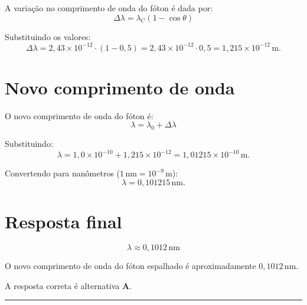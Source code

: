 \documentclass[a4paper,12pt]{article}
\begin{document}
\begin{flushleft}
A variação no comprimento de onda do fóton é dada por:
\[
\Delta \lambda = \lambda_C (1 - \cos\theta)
\]

Substituindo os valores:
\[
\Delta \lambda =
2{,}43 \times 10^{-12} \cdot (1 - 0{,}5) =
2{,}43 \times 10^{-12} \cdot 0{,}5 =
1{,}215 \times 10^{-12}\,\mathrm{m}.
\]

\section*{Novo comprimento de onda}

O novo comprimento de onda do fóton é:
\[
\lambda = \lambda_0 + \Delta\lambda
\]

Substituindo:
\[
\lambda =
1{,}0 \times 10^{-10} + 1{,}215 \times 10^{-12} =
1{,}01215 \times 10^{-10}\,\mathrm{m}.
\]

Convertendo para nanômetros (\(1\,\mathrm{nm} = 10^{-9}\,\mathrm{m}\)):
\[
\lambda =
0{,}101215\,\mathrm{nm}.
\]

\section*{Resposta final}

\[
\boxed{
\lambda \approx 0{,}1012\,\mathrm{nm}
}
\]

O novo comprimento de onda do fóton espalhado é aproximadamente \(0{,}1012\,\mathrm{nm}\).

A resposta correta é alternativa \colorbox{green!50}{\textbf{A}}.
\end{flushleft}

\noindent\rule{\linewidth}{0.6pt}\\
\end{document}
